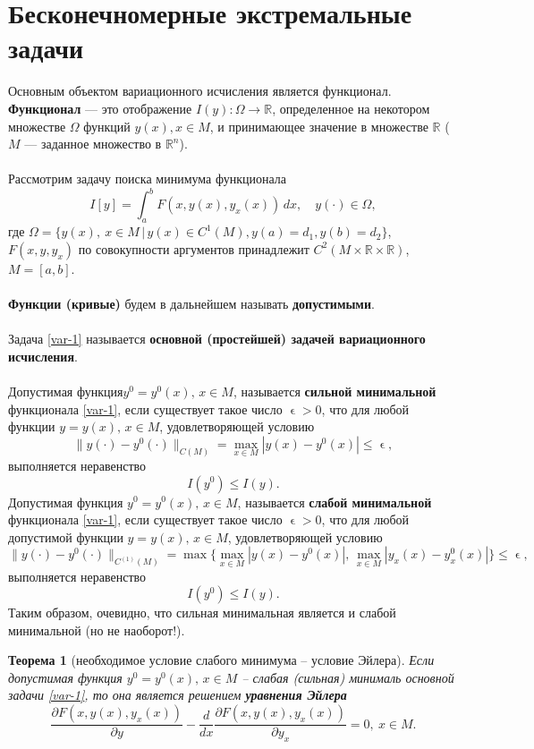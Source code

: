 \documentclass[a4paper, 12pt]{report}
\numberwithin{equation}{section}
\renewcommand{\leq}{\leqslant}
\renewcommand{\varepsilon}{\upvarepsilon}
\renewcommand{\d}{\partial}
\newtheorem*{theorem}{Теорема}
\begin{document}
	\section{Бесконечномерные экстремальные задачи}
	Основным объектом вариационного исчисления является функционал.  
	\textbf{Функционал} — это отображение \( I(y): \Omega \to \mathbb{R} \), определенное на некотором множестве \(\Omega\) функций \( y(x), x \in M \), и принимающее значение в множестве \(\mathbb{R}\) (\(M\) — заданное множество в \(\mathbb{R}^n\)).  
	\\\\
	Рассмотрим задачу поиска минимума функционала
	\begin{equation}
		\label{var-1}
		I[y] = \int_a^b F(x, y(x), y_x(x)) \, dx, \quad y(\cdot) \in \Omega,
	\end{equation}
	где \(\Omega = \{ y(x),\ x\in M \, | \, y(x) \in C^1(M), y(a) = d_1, y(b) = d_2 \}\), $F(x,y,y_x)$ по совокупности аргументов принадлежит $C^2(M\times \mathbb R \times \mathbb R)$, $M = [a,b]$. \\\\
	\textbf{Функции (кривые)} будем в дальнейшем называть \textbf{допустимыми}. \\\\
	Задача \eqref{var-1} называется \textbf{основной (простейшей) задачей вариационного исчисления}. \\\\
	Допустимая функция$y^0 = y^0(x), \, x \in M$, называется \textbf{сильной минимальной} функционала \eqref{var-1}, если существует такое число $\varepsilon > 0$, что для любой функции $y = y(x), \, x \in M$, удовлетворяющей условию
	\[
	\|y(\cdot) - y^0(\cdot)\|_{C(M)} = \max_{x \in M} |y(x) - y^0(x)| \leq \varepsilon,
	\]
	выполняется неравенство
	\[
	I(y^0) \leq I(y).
	\]
	Допустимая функция $y^0 = y^0(x), \, x \in M$, называется \textbf{слабой минимальной} функционала \eqref{var-1}, если существует такое число $\varepsilon > 0$, что для любой допустимой функции $y = y(x), \, x \in M$, удовлетворяющей условию
	\[
	\|y(\cdot) - y^0(\cdot)\|_{C^{(1)}(M)} = \max\{\max_{x \in M} |y(x) - y^0(x)|, \, \max_{x \in M} |y_x(x) - y^0_x(x)|\} \leq \varepsilon,
	\]
	выполняется неравенство 
	\[
	I(y^0) \leq I(y).
	\]
	Таким образом, очевидно, что сильная минимальная является и слабой минимальной (но не наоборот!).
	\begin{theorem}
		[необходимое условие слабого минимума -- условие Эйлера]
		Если допустимая функция $y^0 = y^0(x), \, x \in M$ – слабая (сильная) минималь основной задачи \eqref{var-1}, то она является решением \textbf{уравнения Эйлера}
		\begin{equation}
			\label{euler-cond}
			\dfrac{\d F(x,y(x),y_x(x))}{\d y} - \dfrac{d}{dx} \dfrac{\d F(x,y(x),y_x(x))}{\d y_x} = 0,\ x \in M.
		\end{equation}
	\end{theorem}
\end{document}
